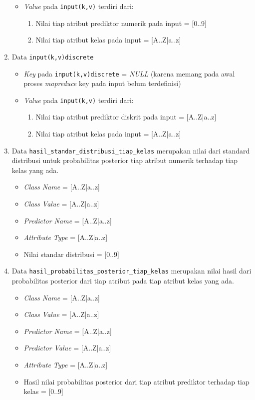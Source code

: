 \begin{enumerate}
\begin{itemize}
		\item \textit{Value} pada \verb|input(k,v)| terdiri dari:
		\begin{enumerate}
			\item Nilai tiap atribut prediktor numerik pada input = [0..9]
			\item Nilai tiap atribut kelas pada input = [A..Z|a..z]
		\end{enumerate}
		
	\end{itemize}

	\item{Data \verb|input(k,v)discrete|}
	\begin{itemize}
		\item \textit{Key} pada \verb|input(k,v)discrete| = \textit{NULL} (karena memang pada awal proses \textit{mapreduce} key pada input belum terdefinisi)

		\item \textit{Value} pada \verb|input(k,v)| terdiri dari:
		\begin{enumerate}
			\item Nilai tiap atribut prediktor diskrit pada input = [A..Z|a..z]
			\item Nilai tiap atribut kelas pada input = [A..Z|a..z]
		\end{enumerate}
		
	\end{itemize}

	\item{Data \verb|hasil_standar_distribusi_tiap_kelas|} merupakan nilai dari standard distribusi untuk probabilitas posterior tiap atribut numerik terhadap tiap kelas yang ada.
	\begin{itemize}
		\item \textit{Class Name} = [A..Z|a..z]
		\item \textit{Class Value} = [A..Z|a..z]
		\item \textit{Predictor Name} = [A..Z|a..z]
		\item \textit{Attribute Type} = [A..Z|a..z]
		\item Nilai standar distribusi = [0..9]
	\end{itemize}
	

	\item{Data \verb|hasil_probabilitas_posterior_tiap_kelas|}
	merupakan nilai hasil dari probabilitas posterior dari tiap atribut pada tiap atribut kelas yang ada.
	\begin{itemize}
		\item \textit{Class Name} = [A..Z|a..z]
		\item \textit{Class Value} = [A..Z|a..z]
		\item \textit{Predictor Name} = [A..Z|a..z]
		\item \textit{Predictor Value} = [A..Z|a..z]
		\item \textit{Attribute Type} = [A..Z|a..z]
		\item Hasil nilai probabilitas posterior dari tiap atribut prediktor terhadap tiap kelas = [0..9]
	\end{itemize}


\end{enumerate}
